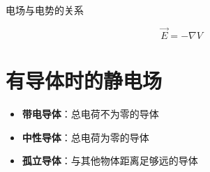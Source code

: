 \documentclass[cn,hazy,blue,14pt,normal]{elegantnote}
\numberwithin{equation}{section}
\begin{document}
\begin{theorem}
  电场与电势的关系
\end{theorem}
\begin{equation}
  \vec{E}=-\nabla V
\end{equation}

\newpage
\section{有导体时的静电场}
\begin{itemize}
	\item \textbf{带电导体}：总电荷不为零的导体
	\item \textbf{中性导体}：总电荷为零的导体
	\item \textbf{孤立导体}：与其他物体距离足够远的导体
\end{itemize}
\newpage
\end{document}
